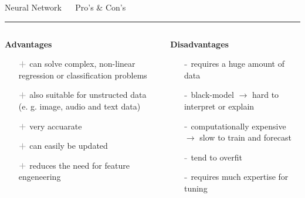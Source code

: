 \documentclass[11pt,compress,t,notes=noshow, xcolor=table]{beamer}
\begin{document}
\LARGE
\begin{frame}{\textcolor{gray!80}{Neural Network} ~~ Pro's \& Con's}
\normalsize
\vspace{-0.5cm}
\noindent \textcolor{gray!80}{\rule{\textwidth}{1pt}}

\vspace{0.3cm}

\footnotesize


\begin{columns}[onlytextwidth]
  \begin{column}{0.5\textwidth}
    \textbf{\textcolor{gray!80}{Advantages}}
    \footnotesize
    \begin{itemize}
      \item[$\textbf{\textcolor{gray!80}{+}}$] can solve complex, non-linear regression or classification problems 
      \item[$\textbf{\textcolor{gray!80}{+}}$] also suitable for unstructed data (e. g. image, audio and text data)  
      \item[$\textbf{\textcolor{gray!80}{+}}$] very accuarate 
      \item[$\textbf{\textcolor{gray!80}{+}}$] can easily be updated %
      \item[$\textbf{\textcolor{gray!80}{+}}$] reduces the need for feature engeneering
    \end{itemize}
  \end{column}

  \begin{column}{0.5\textwidth}
    \textbf{\textcolor{gray!80}{Disadvantages}}
    \footnotesize
    \begin{itemize}
      \item[$\textbf{\textcolor{gray!80}{-}}$] requires a huge amount of data
      \item[$\textbf{\textcolor{gray!80}{-}}$] black-model $\rightarrow$ hard to interpret or explain
      \item[$\textbf{\textcolor{gray!80}{-}}$] computationally expensive $\rightarrow$ slow to train and forecast
      \item[$\textbf{\textcolor{gray!80}{-}}$] tend to overfit
      \item[$\textbf{\textcolor{gray!80}{-}}$] requires much expertise for tuning
    \end{itemize}
  \end{column}
\end{columns}

\vfill

\small


\end{frame}
\end{document}

